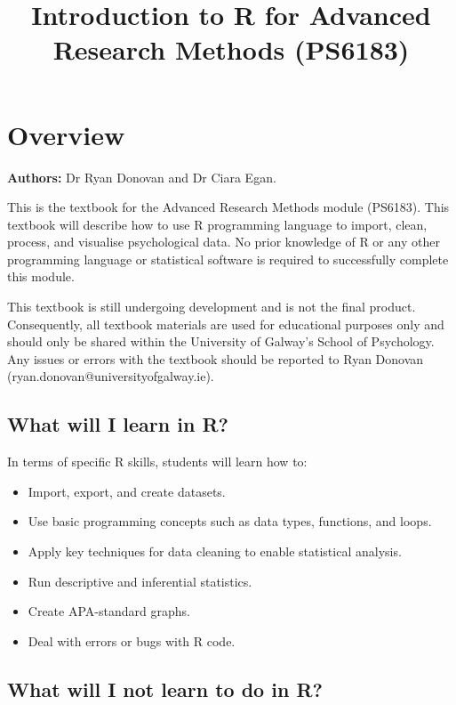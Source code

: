 \documentclass[
]{book}
\title{Introduction to R for Advanced Research Methods (PS6183)}
\author{}
\date{\vspace{-2.5em}}
\begin{document}
\maketitle

{
\setcounter{tocdepth}{1}
\tableofcontents
}
\chapter{\texorpdfstring{\textbf{Overview}}{Overview}}\label{overview}

\textbf{Authors:} Dr Ryan Donovan and Dr Ciara Egan.

This is the textbook for the Advanced Research Methods module (PS6183).
This textbook will describe how to use R programming language to import, clean, process, and visualise psychological data.
No prior knowledge of R or any other programming language or statistical software is required to successfully complete this module.

This textbook is still undergoing development and is not the final product.
Consequently, all textbook materials are used for educational purposes only and should only be shared within the University of Galway's School of Psychology.
Any issues or errors with the textbook should be reported to Ryan Donovan (ryan.donovan@universityofgalway.ie).

\section{What will I learn in R?}\label{what-will-i-learn-in-r}

In terms of specific R skills, students will learn how to:

\begin{itemize}
\item
  Import, export, and create datasets.
\item
  Use basic programming concepts such as data types, functions, and loops.
\item
  Apply key techniques for data cleaning to enable statistical analysis.
\item
  Run descriptive and inferential statistics.
\item
  Create APA-standard graphs.
\item
  Deal with errors or bugs with R code.
\end{itemize}

\section{What will I not learn to do in R?}\label{what-will-i-not-learn-to-do-in-r}
\end{document}
